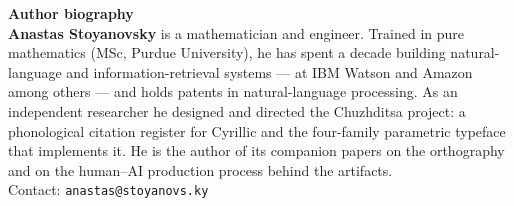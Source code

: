 \documentclass[12pt]{article}
\begin{document}
\noindent\textbf{Author biography}\\[0.5em]
\noindent\textbf{Anastas Stoyanovsky} is a mathematician and engineer. Trained in pure
mathematics (MSc, Purdue University), he has spent a decade building natural-language
and information-retrieval systems — at IBM Watson and Amazon among others — and holds
patents in natural-language processing. As an independent researcher he designed and
directed the Chuzhditsa project: a phonological citation register for Cyrillic and the
four-family parametric typeface that implements it. He is the author of its companion
papers on the orthography and on the human--AI production process behind the artifacts.\\[1em]
\noindent Contact: \texttt{anastas@stoyanovs.ky}
\end{document}

